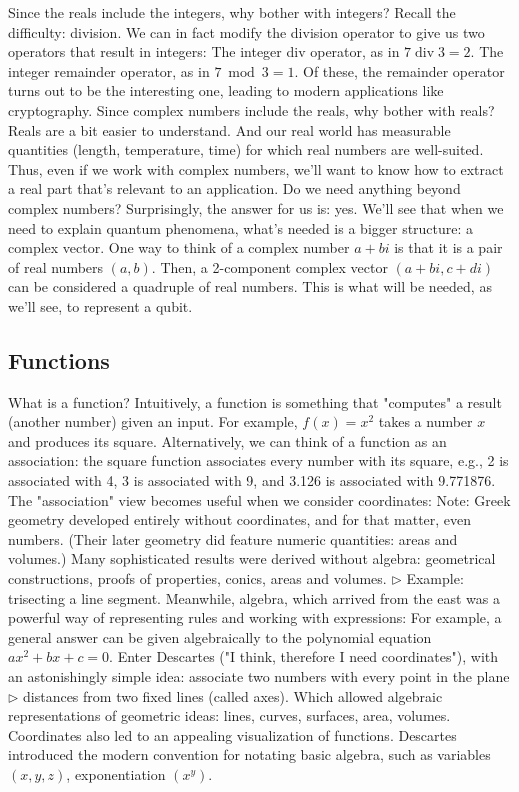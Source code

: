 \documentclass[main.tex]{subfiles}
\begin{document}
Since the reals include the integers, why bother with integers? Recall the difficulty: division. We can in fact modify the division operator to give us two operators that result in integers: The integer div operator, as in $7 \operatorname{div} 3=2$. The integer remainder operator, as in $7 \bmod 3=1$. Of these, the remainder operator turns out to be the interesting one, leading to modern applications like cryptography. Since complex numbers include the reals, why bother with reals? Reals are a bit easier to understand. And our real world has measurable quantities (length, temperature, time) for which real numbers are well-suited. Thus, even if we work with complex numbers, we'll want to know how to extract a real part that's relevant to an application. Do we need anything beyond complex numbers? Surprisingly, the answer for us is: yes. We'll see that when we need to explain quantum phenomena, what's needed is a bigger structure: a complex vector. One way to think of a complex number $a+b i$ is that it is a pair of real numbers $(a, b)$. Then, a 2-component complex vector $(a+b i, c+d i)$ can be considered a quadruple of real numbers. This is what will be needed, as we'll see, to represent a qubit.

\subsection{Functions}

What is a function? Intuitively, a function is something that "computes" a result (another number) given an input. For example, $f(x)=x^{2}$ takes a number $x$ and produces its square. Alternatively, we can think of a function as an association: the square function associates every number with its square, e.g., 2 is associated with 4, 3 is associated with 9, and 3.126 is associated with 9.771876.\\

The "association" view becomes useful when we consider coordinates: Note: Greek geometry developed entirely without coordinates, and for that matter, even numbers. (Their later geometry did feature numeric quantities: areas and volumes.) Many sophisticated results were derived without algebra: geometrical constructions, proofs of properties, conics, areas and volumes. $\triangleright$ Example: trisecting a line segment. Meanwhile, algebra, which arrived from the east was a powerful way of representing rules and working with expressions: For example, a general answer can be given algebraically to the polynomial equation $a x^{2}+b x+c=0$. Enter Descartes ("I think, therefore I need coordinates"), with an astonishingly simple idea: associate two numbers with every point in the plane $\triangleright$ distances from two fixed lines (called axes). Which allowed algebraic representations of geometric ideas: lines, curves, surfaces, area, volumes. Coordinates also led to an appealing visualization of functions. Descartes introduced the modern convention for notating basic algebra, such as variables $(x, y, z)$, exponentiation $\left(x^{y}\right)$.\\
\end{document}

